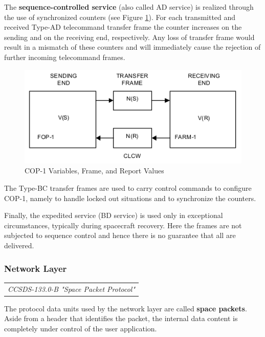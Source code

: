 The \textbf{sequence-controlled service} (also called AD service) is realized through the use of synchronized counters (see Figure \ref{fig: COP-1 Variables, Frame, and Report Values}). For each transmitted and received Type-AD telecommand transfer frame the counter increases on the sending and on the receiving end, respectively. Any loss of transfer frame would result in a mismatch of these counters and will immediately cause the rejection of further incoming telecommand frames.

\begin{figure}[h]
\centering\includegraphics[scale=0.6]{fig/cop-1_variables_frame_and_report_values}
\caption{COP-1 Variables, Frame, and Report Values}
\label{fig: COP-1 Variables, Frame, and Report Values}
\end{figure}

The Type-BC transfer frames are used to carry control commands to configure COP-1, namely to handle locked out situations and to synchronize the counters.

Finally, the expedited service (BD service) is used only in exceptional circumstances, typically during spacecraft recovery. Here the frames are not subjected to sequence control and hence there is no guarantee that all are delivered.

\subsubsection{Network Layer}
\label{sec:Network Layer}

\begin{tabular}{l}
\textit{CCSDS-133.0-B "Space Packet Protocol" \cite{CCSDS-133.0-B}} 
\end{tabular}

The protocol data units used by the network layer are called \textbf{space packets}. Aside from a header that identifies the packet, the internal data content is completely under control of the user application.

